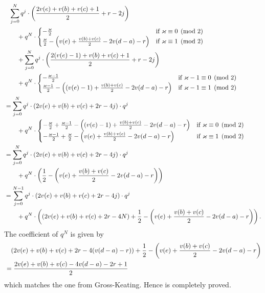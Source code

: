 \begin{align*}
  &\phantom= \sum_{j=0}^N q^j
  \cdot \left( \frac{2v(e)+v(b)+v(c)+1}{2} + r - 2j \right) \\
  &\qquad + q^{N} \cdot
  \begin{cases}
    -\frac{\varkappa}{2} & \text{if }\varkappa \equiv 0 \pmod 2 \\
    \frac{\varkappa}{2} - \left( v(e)+\frac{v(b)+v(c)}{2}-2v(d-a)-r \right)
    & \text{if }\varkappa \equiv 1 \pmod 2
  \end{cases} \\
  &\qquad + \sum_{j=0}^N q^j
  \cdot \left( \frac{2(v(e)-1)+v(b)+v(c)+1}{2} + r - 2j \right) \\
  &\qquad + q^{N} \cdot
  \begin{cases}
    -\frac{\varkappa-1}{2} & \text{if }\varkappa-1 \equiv 0 \pmod 2 \\
    \frac{\varkappa-1}{2} - \left( (v(e)-1)+\frac{v(b)+v(c)}{2}-2v(d-a)-r \right)
    & \text{if }\varkappa-1 \equiv 1 \pmod 2 \\
  \end{cases} \\
  &= \sum_{j=0}^N q^j
  \cdot \left( 2v(e)+v(b)+v(c) + 2r - 4j \right) \cdot q^j \\
  &\qquad + q^{N} \cdot
  \begin{cases}
    -\frac{\varkappa}{2} + \frac{\varkappa-1}{2} - \left( (v(e)-1) +\frac{v(b)+v(c)}{2}-2v(d-a)-r \right)
    & \text{if }\varkappa \equiv 0 \pmod 2 \\
    -\frac{\varkappa-1}{2} + \frac{\varkappa}{2} - \left( v(e)+\frac{v(b)+v(c)}{2}-2v(d-a)-r \right)
    & \text{if }\varkappa \equiv 1 \pmod 2 \\
  \end{cases} \\
  &= \sum_{j=0}^N q^j
  \cdot \left( 2v(e)+v(b)+v(c) + 2r - 4j \right) \cdot q^j \\
  &\qquad + q^{N} \cdot
    \left( \half - \left( v(e)+\frac{v(b)+v(c)}{2}-2v(d-a)-r \right) \right) \\
  &= \sum_{j=0}^{N-1} q^j
  \cdot \left( 2v(e)+v(b)+v(c) + 2r - 4j \right) \cdot q^j \\
  &\qquad + q^{N} \cdot
    \left( \left( 2v(e)+v(b)+v(c) + 2r - 4N \right) +
    \half - \left( v(e)+\frac{v(b)+v(c)}{2}-2v(d-a)-r \right) \right).
\end{align*}
The coefficient of $q^N$ is given by
\begin{align*}
  &\phantom= \left( 2v(e)+v(b)+v(c) + 2r - 4(v(d-a)-r) \right) +
  \half - \left( v(e)+\frac{v(b)+v(c)}{2}-2v(d-a)-r \right) \\
  &= \frac{2v(e)+v(b)+v(c)-4v(d-a)-2r+1}{2}
\end{align*}
which matches the one from Gross-Keating.
Hence  is completely proved.

